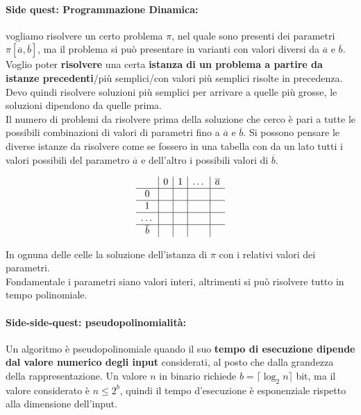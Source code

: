 \documentclass[11pt]{article}
\begin{document}
	\newpage
	
	\paragraph{Side quest: Programmazione Dinamica:} vogliamo risolvere un certo problema $\pi$, nel quale sono presenti dei parametri $\pi [\overline{a},\overline{b}]$, ma il problema si può presentare in varianti con valori diversi da $\overline{a}$ e $\overline{b}$.\\
	
	Voglio poter \textbf{risolvere} una certa \textbf{istanza di un problema a partire da istanze precedenti}/più semplici/con valori più semplici risolte in precedenza.\\
	Devo quindi risolvere soluzioni più semplici per arrivare a quelle più grosse, le soluzioni dipendono da quelle prima.\\
	
	Il numero di problemi da risolvere prima della soluzione che cerco è pari a tutte le possibili combinazioni di valori di parametri fino a $\overline{a}$ e $\overline{b}$. Si possono pensare le diverse istanze da risolvere come se fossero in una tabella con da un lato tutti i valori possibili del parametro $\overline{a}$ e dell'altro i possibili valori di $\overline{b}$.
	
	$$
	\begin{array}{c | c | c | c | c }
		& 0 & 1 & \dots & \overline{a} \\
		\hline
		0 & & & & \\
		\hline
		1 & & & & \\
		\hline
		\dots & & & & \\
		\hline
		\overline{b} & & & &
	\end{array}
	$$
	
	In ognuna delle celle la soluzione dell'istanza di $\pi$ con i relativi valori dei parametri.\\
	
	Fondamentale i parametri siano valori interi, altrimenti si può risolvere tutto in tempo polinomiale.\\
	
	\paragraph{Side-side-quest: pseudopolinomialità:} Un algoritmo è pseudopolinomiale quando il suo \textbf{tempo di esecuzione dipende dal valore numerico degli input} considerati, al posto che dalla grandezza della rappresentazione. Un valore $n$ in binario richiede $b = \lceil \log_2 n \rceil$ bit, ma il valore considerato è $n \leq 2^b$, quindi il tempo d'esecuzione è esponenziale rispetto alla dimensione dell'input.\\
	
\end{document}
